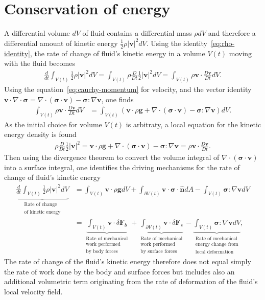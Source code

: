 \section{Conservation of energy}
A differential volume $dV$ of fluid contains a differential mass $\rho dV$ and therefore a differential amount of kinetic energy $\tfrac{1}{2}\rho|\bm{v}|^2dV$. Using the identity~\eqref{eq:rho-identity}, the rate of change of fluid's kinetic energy in a volume $V(t)$ moving with the fluid becomes
\begin{align}
    \frac{d}{dt}\int_{V(t)}\frac{1}{2}\rho|\bm{v}|^2dV=\int_{V(t)}\rho\frac{D}{Dt}\frac{1}{2}|\bm{v}|^2dV=\int_{V(t)}\rho\bm{v}\cdot\frac{D\bm{v}}{Dt}dV.
\end{align}
Using the equation~\eqref{eq:cauchy-momentum} for velocity, and the vector identity $\bm{v}\cdot\nabla\cdot\bm{\sigma}=\nabla\cdot(\bm{\sigma}\cdot\bm{v})-\bm{\sigma}:\nabla\bm{v}$, one finds
\begin{align}
    \int_{V(t)}\rho\bm{v}\cdot\frac{D\bm{v}}{Dt}dV&=\int_{V(t)}\left(\bm{v}\cdot\rho\bm{g}+\nabla\cdot(\bm{\sigma}\cdot\bm{v})-\bm{\sigma}:\nabla\bm{v}\right) dV.
\end{align}
As the initial choice for volume $V(t)$ is arbitraty, a local equation for the kinetic energy density is found
\begin{align}
    \rho\frac{D}{Dt}\frac{1}{2}|\bm{v}|^2=\bm{v}\cdot\rho\bm{g}+\nabla\cdot(\bm{\sigma}\cdot\bm{v})-\bm{\sigma}:\nabla\bm{v}=\rho \bm{v}\cdot\frac{D\bm{v}}{Dt}.
\end{align}
Then using the divergence theorem to convert the volume integral of $\nabla\cdot(\bm{\sigma}\cdot\bm{v})$ into a surface integral, one identifies the driving mechanisms for the rate of change of fluid's kinetic energy
\begin{align}\label{eq:material-rate-of-change-of-kinetic-energy}
    \underbrace{\frac{d}{dt}\int_{V(t)}\frac{1}{2}\rho|\bm{v}|^2dV}_{\substack{\text{Rate of change}\\\text{of kinetic energy}}}&=\int_{V(t)}\bm{v}\cdot\rho\bm{g}dV+\int_{\partial V(t)}\bm{v}\cdot\bm{\sigma}\cdot\bm{\hat{n}}dA-\int_{V(t)}\bm{\sigma}:\nabla\bm{v}dV\nonumber\\
    &=\underbrace{\int_{V(t)}\bm{v}\cdot\delta\bm{F}_b}_{\substack{\text{Rate of mechanical}\\\text{work performed}\\\text{by body forces}}}+\underbrace{\int_{\partial V(t)}\bm{v}\cdot\delta\bm{F}_s}_{\substack{\text{Rate of mechanical}\\\text{work performed}\\\text{by surface forces}}}-\underbrace{\int_{V(t)}\bm{\sigma}:\nabla\bm{v}dV}_{\substack{\text{Rate of mechanical}\\\text{energy change from}\\\text{local deformation}}},
\end{align}
The rate of change of the fluid's kinetic energy therefore does not equal simply the rate of work done by the body and surface forces but includes also an additional volumetric term originating from the rate of deformation of the fluid's local velocity field.

